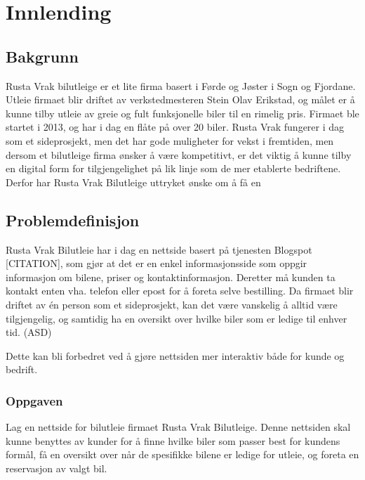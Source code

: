 \chapter{Innlending}


\section{Bakgrunn}
Rusta Vrak bilutleige er et lite firma basert i Førde og Jøster i Sogn og Fjordane. Utleie firmaet blir driftet av verkstedmesteren Stein Olav Erikstad, og målet er å kunne tilby utleie av greie og fult funksjonelle biler til en rimelig pris. Firmaet ble startet i 2013, og har i dag en flåte på over 20 biler. Rusta Vrak fungerer i dag som et sideprosjekt, men det har gode muligheter for vekst i fremtiden, men dersom et bilutleige firma ønsker å være kompetitivt, er det viktig å kunne tilby en digital form for tilgjengelighet på lik linje som de mer etablerte bedriftene. Derfor har Rusta Vrak Bilutleige uttryket ønske om å få en 


\section{Problemdefinisjon}
Rusta Vrak Bilutleie har i dag en nettside basert på tjenesten Blogspot [CITATION], som gjør at det er en enkel informasjonsside som oppgir informasjon om bilene, priser og kontaktinformasjon. Deretter må kunden ta kontakt enten vha. telefon eller epost for å foreta selve bestilling. Da firmaet blir driftet av én person som et sideprosjekt, kan det være vanskelig å alltid være tilgjengelig, og samtidig ha en oversikt over hvilke biler som er ledige til enhver tid. (ASD)

Dette kan bli forbedret ved å gjøre nettsiden mer interaktiv både for kunde og bedrift. 

\subsection{Oppgaven}
Lag en nettside for bilutleie firmaet Rusta Vrak Bilutleige. Denne nettsiden skal kunne benyttes av kunder for å finne hvilke biler som passer best for kundens formål, få en oversikt over når de spesifikke bilene er ledige for utleie, og foreta en reservasjon av valgt bil.

